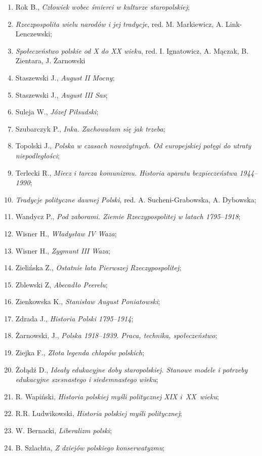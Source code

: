 \documentclass[a4paper,11pt]{article}
\begin{document}
\begin{enumerate}
\item Rok B., \emph{Człowiek wobec śmierci w kulturze staropolskiej};
\item \emph{Rzeczpospolita wielu narodów i jej tradycje}, red. M.
  Markiewicz, A. Link-Lenczewski;
\item \emph{Społeczeństwo polskie od X do XX wieku}, red. I.
  Ignatowicz, A. Mączak, B. Zientara, J. Żarnowski
\item Staszewski J., \emph{August II Mocny};
\item Staszewski J., \emph{August III Sas};
\item Suleja W., \emph{Józef Piłsudski};
\item Szubarczyk P., \emph{Inka. Zachowałam się jak trzeba\ld};
\item Topolski J., \emph{Polska w czasach nowożytnych. Od europejskiej
    potęgi do utraty niepodległości};
\item Terlecki R., \emph{Miecz i tarcza komunizmu. Historia aparatu
    bezpieczeństwa 1944--1990};
\item \emph{Tradycje polityczne dawnej Polski}, red. A.
  Sucheni-Grabowska, A. Dybowska;
\item Wandycz P., \emph{Pod zaborami. Ziemie Rzeczypospolitej w latach
    1795--1918};
\item Wisner H., \emph{Władysław IV Waza};
\item Wisner H., \emph{Zygmunt III Waza};
\item Zielińska Z., \emph{Ostatnie lata Pierwszej Rzeczypospolitej};
\item Zblewski Z, \emph{Abecadło Peerelu};
\item Zienkowska K., \emph{Stanisław August Poniatowski};
\item Zdrada J., \emph{Historia Polski 1795--1914};
\item Żarnowski, J., \emph{Polska 1918--1939. Praca, technika,
    społeczeństwo};
\item Ziejka F., \emph{Złota legenda chłopów polskich};
\item Żołądź D., \emph{Ideały edukacyjne doby staropolskiej. Stanowe
    modele i potrzeby edukacyjne szesnastego i siedemnastego wieku};
\item R. Wapiński, \emph{Historia polskiej myśli politycznej XIX
    i~XX~wieku};
\item R.R. Ludwikowski, \emph{Historia polskiej myśli politycznej};
\item W. Bernacki, \emph{Liberalizm polski};
\item B. Szlachta, \emph{Z dziejów polskiego konserwatyzmu};

\end{enumerate}
\end{document}
